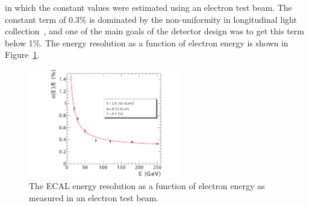 in which the constant values were estimated using an electron test beam. The constant term of $0.3 \%$ is dominated by the non-uniformity in longitudinal light collection~\cite{1742-6596-587-1-012001}, and one of the main goals of the detector design was to get this term below 1\%. The energy resolution as a function of electron energy is shown in Figure~\ref{fig:cms:ecal-res}.
\begin{figure}[h] 
    \centering
    \includegraphics[width=0.6\textwidth]{figures/cms/ECAL-energy-resolution.pdf}
    \caption{The ECAL energy resolution as a function of electron energy as measured in an electron test beam.~\cite{Adzic:2007mi}}
    \label{fig:cms:ecal-res}
\end{figure}


